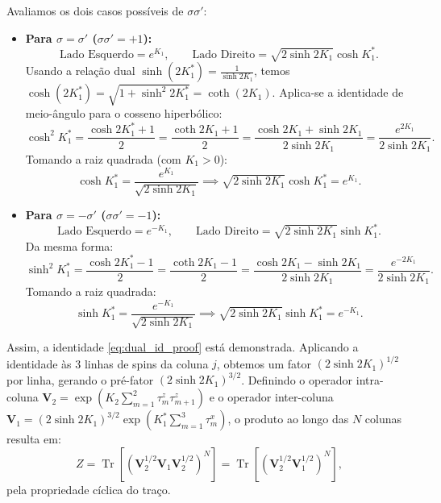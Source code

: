\documentclass[11pt,a4paper]{article}
\begin{document}
%
Avaliamos os dois casos possíveis de $\sigma \sigma'$:
%
\begin{itemize}
    \item \textbf{Para $\sigma = \sigma'$ ($\sigma \sigma' = +1$):}
    \begin{equation}
        \text{Lado Esquerdo} = e^{K_1}, \qquad \text{Lado Direito} = \sqrt{2\sinh 2K_1} \cosh K_1^*.
    \end{equation}
%    
    Usando a relação dual $\sinh(2K_1^*) = \frac{1}{\sinh 2K_1}$, temos $\cosh(2K_1^*) = \sqrt{1+\sinh^2 2K_1^*} = \coth(2K_1)$. 
    Aplica-se a identidade de meio-ângulo para o cosseno hiperbólico:
    \begin{equation}
        \cosh^2 K_1^* = \frac{\cosh 2K_1^* + 1}{2} = \frac{\coth 2K_1 + 1}{2} = \frac{\cosh 2K_1 + \sinh 2K_1}{2\sinh 2K_1} = \frac{e^{2K_1}}{2\sinh 2K_1}.
    \end{equation}
    Tomando a raiz quadrada (com $K_1 > 0$):
%    
    \begin{equation}
        \cosh K_1^* = \frac{e^{K_1}}{\sqrt{2\sinh 2K_1}} \implies \sqrt{2\sinh 2K_1} \cosh K_1^* = e^{K_1}.
    \end{equation}
%
    \item \textbf{Para $\sigma = -\sigma'$ ($\sigma \sigma' = -1$):}
    \begin{equation}
        \text{Lado Esquerdo} = e^{-K_1}, \qquad \text{Lado Direito} = \sqrt{2\sinh 2K_1} \sinh K_1^*.
    \end{equation}
%    
    Da mesma forma:
%    
    \begin{equation}
        \sinh^2 K_1^* = \frac{\cosh 2K_1^* - 1}{2} = \frac{\coth 2K_1 - 1}{2} = \frac{\cosh 2K_1 - \sinh 2K_1}{2\sinh 2K_1} = \frac{e^{-2K_1}}{2\sinh 2K_1}.
    \end{equation}
%    
    Tomando a raiz quadrada:
    \begin{equation}
        \sinh K_1^* = \frac{e^{-K_1}}{\sqrt{2\sinh 2K_1}} \implies \sqrt{2\sinh 2K_1} \sinh K_1^* = e^{-K_1}.
    \end{equation}
\end{itemize}
%
Assim, a identidade \eqref{eq:dual_id_proof} está demonstrada. Aplicando a identidade às 3 linhas de spins da coluna $j$, obtemos um fator $(2\sinh 2K_1)^{1/2}$ por linha, gerando o pré-fator $(2\sinh 2K_1)^{3/2}$. Definindo o operador intra-coluna $\mathbf{V}_2 = \exp\left( K_2 \sum_{m=1}^2 \tau_m^z \tau_{m+1}^z \right)$ e o operador inter-coluna $\mathbf{V}_1 = (2\sinh 2K_1)^{3/2} \exp\left( K_1^* \sum_{m=1}^3 \tau_m^x \right)$, o produto ao longo das $N$ colunas resulta em:
%
\begin{equation}
    \boxed{Z = \operatorname{Tr}\left[ \left(\mathbf{V}_2^{1/2} \mathbf{V}_1 \mathbf{V}_2^{1/2}\right)^N \right] = \operatorname{Tr}\left[ \left(\mathbf{V}_2^{1/2} \mathbf{V}_1^{1/2}\right)^N \right]},
\end{equation}
%
pela propriedade cíclica do traço.
%
\end{document}
